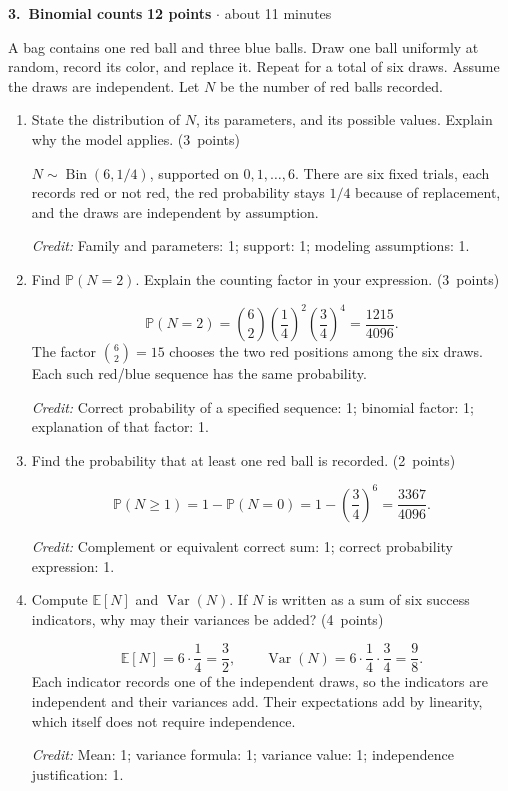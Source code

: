 \documentclass[11pt,letterpaper]{article}
\newcommand{\Prob}{\mathbb P}
\newcommand{\E}{\mathbb E}
\DeclareMathOperator{\Var}{Var}
\newcommand{\partpts}[1]{\unskip\nobreak\hspace{.3em}%
  \mbox{\small\color{muted}(#1 points)}}
\newcommand{\credit}[1]{\par{\footnotesize\color{muted}\textit{Credit:} #1}}
\newcommand{\problem}[4]{\par\addvspace{8pt}%
  {\large\bfseries\color{indigo}#1.\ #2}\hfill
  {\small\color{muted}\textbf{#3 points} $\cdot$ about #4 minutes}\par\nobreak}
\begin{document}
\newpage
\problem{3}{Binomial counts}{12}{11}
A bag contains one red ball and three blue balls. Draw one ball uniformly
at random, record its color, and replace it. Repeat for a total of six
draws. Assume the draws are independent. Let $N$ be the number of red
balls recorded.
\begin{enumerate}
  \item State the distribution of $N$, its parameters, and its possible
  values. Explain why the model applies. \partpts{3}
  \begin{solution}[1.2in]
    $N\sim\operatorname{Bin}(6,1/4)$, supported on $0,1,\ldots,6$.
    There are six fixed trials, each records red or not red, the red
    probability stays $1/4$ because of replacement, and the draws are
    independent by assumption.
    \credit{Family and parameters: 1; support: 1; modeling assumptions: 1.}
  \end{solution}

  \item Find $\Prob(N=2)$. Explain the counting factor in your expression.
  \partpts{3}
  \begin{solution}[1.5in]
    \[
      \Prob(N=2)=\binom62\left(\frac14\right)^2
                            \left(\frac34\right)^4
                    =\frac{1215}{4096}.
    \]
    The factor $\binom62=15$ chooses the two red positions among the six
    draws. Each such red/blue sequence has the same probability.
    \credit{Correct probability of a specified sequence: 1;
    binomial factor: 1; explanation of that factor: 1.}
  \end{solution}

  \item Find the probability that at least one red ball is recorded.
  \partpts{2}
  \begin{solution}[1.25in]
    \[
      \Prob(N\ge1)=1-\Prob(N=0)
        =1-\left(\frac34\right)^6=\frac{3367}{4096}.
    \]
    \credit{Complement or equivalent correct sum: 1;
    correct probability expression: 1.}
  \end{solution}

  \item Compute $\E[N]$ and $\Var(N)$. If $N$ is written as a sum of
  six success indicators, why may their variances be added? \partpts{4}
  \begin{solution}[1.65in]
    \[
      \E[N]=6\cdot\frac14=\frac32,
      \qquad \Var(N)=6\cdot\frac14\cdot\frac34=\frac98.
    \]
    Each indicator records one of the independent draws, so the indicators
    are independent and their variances add. Their expectations add by
    linearity, which itself does not require independence.
    \credit{Mean: 1; variance formula: 1; variance value: 1;
    independence justification: 1.}
  \end{solution}
\end{enumerate}
\end{document}
